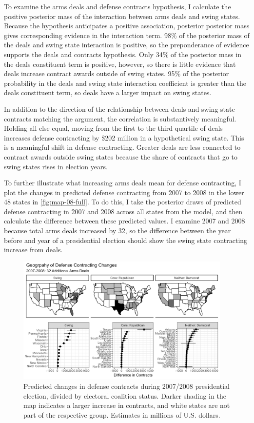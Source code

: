 \documentclass[12pt]{article}
\begin{document}
To examine the arms deals and defense contracts hypothesis, I calculate the positive posterior mass of the interaction between arms deals and swing states. Because the hypothesis anticipates a positive association, posterior posterior mass gives corresponding evidence in the interaction term.
98\% of the posterior mass of the deals and swing state interaction is positive, so the preponderance of evidence supports the deals and contracts hypothesis.
Only 34\% of the posterior mass in the deals constituent term is positive, however, so there is little evidence that deals increase contract awards outside of swing states.
95\% of the posterior probability in the deals and swing state interaction coefficient is greater than the deals constituent term, so deals have a larger impact on swing states. 


In addition to the direction of the relationship between deals and swing state contracts matching the argument, the correlation is substantively meaningful. 
Holding all else equal, moving from the first to the third quartile of deals increases defense contracting by \$202 million in a hypothetical swing state. 
This is a meaningful shift in defense contracting. 
Greater deals are less connected to contract awards outside swing states because the share of contracts that go to swing states rises in election years.


To further illustrate what increasing arms deals mean for defense contracting, I plot the changes in predicted defense contracting from 2007 to 2008 in the lower 48 states in \autoref{fig:map-08-full}. 
To do this, I take the posterior draws of predicted defense contracting in 2007 and 2008 across all states from the model, and then calculate the difference between these predicted values. 
I examine 2007 and 2008 because total arms deals increased by 32, so the difference between the year before and year of a presidential election should show the swing state contracting increase from deals. 


\begin{figure}[htpb]
	\centering
		\includegraphics[width=0.95\textwidth]{../figures/map-08-full.png}
	\caption{Predicted changes in defense contracts during 2007/2008 presidential election, divided by electoral coalition status. Darker shading in the map indicates a larger increase in contracts, and white states are not part of the respective group. Estimates in millions of U.S. dollars.}
	\label{fig:map-08-full}
\end{figure}
\end{document}
